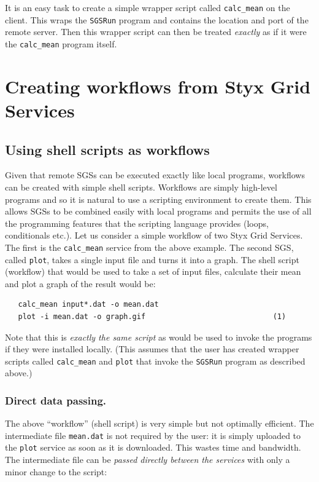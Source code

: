 \documentclass{llncs}
\begin{document}
It is an easy task to create a simple wrapper script called {\tt calc\_mean} on the client.  This wraps the {\tt SGSRun} program and contains the location and port of the remote server.  Then this wrapper script can then be treated {\em exactly\/} as if it were the {\tt calc\_mean} program itself.


\section{Creating workflows from Styx Grid Services}

\subsection{Using shell scripts as workflows}\label{sec:shellscripts}
Given that remote SGSs can be executed exactly like local programs, workflows can be created with simple shell scripts.  Workflows are simply high-level programs and so it is natural to use a scripting environment to create them.  This allows SGSs to be combined easily with local programs and permits the use of all the programming features that the scripting language provides (loops, conditionals etc.).  Let us consider a simple workflow of two Styx Grid Services.  The first is the {\tt calc\_mean} service from the above example.  The second SGS, called {\tt plot}, takes a single input file and turns it into a graph.  The shell script (workflow) that would be used to take a set of input files, calculate their mean and plot a graph of the result would be:

\begin{verbatim}
   calc_mean input*.dat -o mean.dat
   plot -i mean.dat -o graph.gif                             (1)
\end{verbatim}

Note that this is {\em exactly the same script\/} as would be used to invoke the programs if they were installed locally.  (This assumes that the user has created wrapper scripts called {\tt calc\_mean} and {\tt plot} that invoke the {\tt SGSRun} program as described above.)

\subsubsection{Direct data passing.}\label{sec:datapassing}

The above ``workflow'' (shell script) is very simple but not optimally efficient.  The intermediate file {\tt mean.dat} is not required by the user: it is simply uploaded to the {\tt plot} service as soon as it is downloaded.  This wastes time and bandwidth.  The intermediate file can be {\em passed directly between the services\/} with only a minor change to the script:
\end{document}
